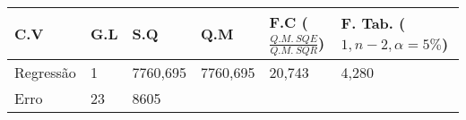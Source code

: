 \documentclass[
  openany]{book}
\begin{document}
\begin{longtable}[]{@{}llllll@{}}
\toprule
\begin{minipage}[b]{0.14\columnwidth}\raggedright
C.V\strut
\end{minipage} & \begin{minipage}[b]{0.14\columnwidth}\raggedright
G.L\strut
\end{minipage} & \begin{minipage}[b]{0.14\columnwidth}\raggedright
S.Q\strut
\end{minipage} & \begin{minipage}[b]{0.14\columnwidth}\raggedright
Q.M\strut
\end{minipage} & \begin{minipage}[b]{0.14\columnwidth}\raggedright
F.C (\(\frac{Q.M. \  SQE}{Q.M.\ SQR}\))\strut
\end{minipage} & \begin{minipage}[b]{0.14\columnwidth}\raggedright
F. Tab. (\(1,n-2,\alpha=5\%\))\strut
\end{minipage}\tabularnewline
\midrule
\endhead
\begin{minipage}[t]{0.14\columnwidth}\raggedright
Regressão\strut
\end{minipage} & \begin{minipage}[t]{0.14\columnwidth}\raggedright
1\strut
\end{minipage} & \begin{minipage}[t]{0.14\columnwidth}\raggedright
7760,695\strut
\end{minipage} & \begin{minipage}[t]{0.14\columnwidth}\raggedright
7760,695\strut
\end{minipage} & \begin{minipage}[t]{0.14\columnwidth}\raggedright
20,743\strut
\end{minipage} & \begin{minipage}[t]{0.14\columnwidth}\raggedright
4,280\strut
\end{minipage}\tabularnewline
\begin{minipage}[t]{0.14\columnwidth}\raggedright
Erro\strut
\end{minipage} & \begin{minipage}[t]{0.14\columnwidth}\raggedright
23\strut
\end{minipage} & \begin{minipage}[t]{0.14\columnwidth}\raggedright
8605\strut
\end{minipage} & \begin{minipage}[t]{0.14\columnwidth}\raggedright

\end{minipage}
\end{longtable}
\end{document}
